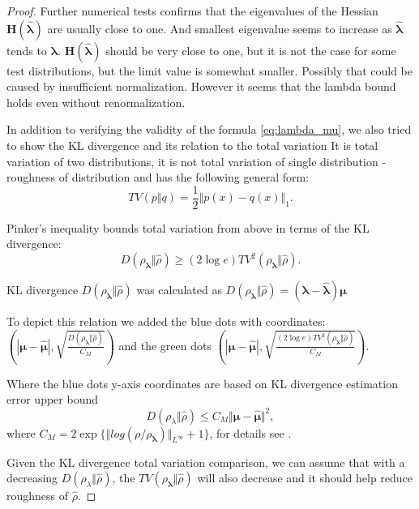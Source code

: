 \documentclass{article}
\def\vc#1{\mathbf{\boldsymbol{#1}}}     %
\def\tn#1{\boldsymbol{#1}}
\def\vl{{\vc\lambda}}
\def\estvl{{\vc{\hat\lambda}}}
\def\estrho{\hat\rho}
\def\vmu{\vc\mu}
\def\estvmu{{\vc{\hat\mu}}}
\newcommand{\ms}[1]{{\color{red}#1}}  %
\begin{document}
\begin{proof}
Further numerical tests confirms that the eigenvalues of the Hessian $\tn H(\estvl)$ are usually close to one. And smallest eigenvalue seems to increase as $\estvl$ tends to $\vl$. 
$\tn H(\estvl)$ should be very close to one, but it is not the case for some test distributions, but the limit value is somewhat smaller. Possibly that could be caused by insufficient normalization. 
However it seems that the lambda bound holds even without renormalization.



In addition to verifying the validity of the formula \ref{eq:lambda_mu}, we also tried to show the KL divergence and its relation to the total variation \ms{It is total variation of two  distributions, it is not total variation of single distribution - roughness of distribution} and has the following general form:
$$
TV(p\Vert q) = \frac{1}{2}\Vert p(x) - q(x)\Vert_1.
$$ 

Pinker's inequality bounds total variation from above in terms of the KL divergence: %
\begin{equation}
D(\rho_{\vl}\Vert\estrho) \geq (2\log e) {TV}^2(\rho_{\vl}\Vert\estrho).
\end{equation}

\ms{KL divergence $D(\rho_{\vl}\Vert\estrho)$ was calculated as $D(\rho_{\vl}\Vert\estrho) = (\vl - \hat{\vl})\vmu$}

To depict this relation we added
the blue dots with coordinates: $(|\vmu - \estvmu|, \sqrt{\frac{D(\rho_{\vl}\Vert\estrho)}{C_M}})$
and the green dots $(|\vmu - \estvmu|, \sqrt{\frac{(2\log e) {TV}^2(\rho_{\vl}\Vert\estrho)}{C_M}})$.


Where the blue dots y-axis coordinates are based on KL divergence estimation error upper bound $$D(\rho_{\lambda} \Vert \hat{\rho}) \leq C_M \Vert \vmu - \hat{\vmu}\Vert^2,$$ where $C_M = 2\exp\{\Vert log(\rho / \rho_{\vl}) \Vert_{L^{\infty}} + 1\}$, for details see \cite[p. 1358]{Barron1991}.

Given the KL divergence total variation comparison, we can assume that with a decreasing $D(\rho_{\lambda} \Vert \hat{\rho})$, the ${TV}(\rho_{\vl}\Vert\estrho)$ will also decrease and it should help reduce roughness of $\hat{\rho}$.




\end{proof}
\end{document}
